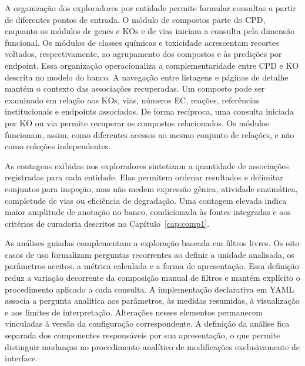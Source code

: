 A organização dos exploradores por entidade permite formular consultas a
partir de diferentes pontos de entrada. O módulo de compostos parte do CPD,
enquanto os módulos de genes e KOs e de vias iniciam a consulta pela dimensão
funcional. Os módulos de classes químicas e toxicidade acrescentam recortes
voltados, respectivamente, ao agrupamento dos compostos e às predições por
endpoint. Essa organização operacionaliza a complementaridade entre CPD e KO
descrita no modelo do banco. A navegação entre listagens e páginas de detalhe mantém o contexto das
associações recuperadas. Um composto pode ser examinado em relação aos KOs,
vias, números EC, reações, referências institucionais e endpoints associados.
De forma recíproca, uma consulta iniciada por KO ou via permite recuperar os
compostos relacionados. Os módulos funcionam, assim, como diferentes acessos
ao mesmo conjunto de relações, e não como coleções independentes.


As contagens exibidas nos exploradores sintetizam a quantidade de associações
registradas para cada entidade. Elas permitem ordenar resultados e delimitar
conjuntos para inspeção, mas não medem expressão gênica, atividade enzimática,
completude de vias ou eficiência de degradação. Uma contagem elevada indica
maior amplitude de anotação no banco, condicionada às fontes integradas e aos
critérios de curadoria descritos no Capítulo~\ref{cap:comp1}.

As análises guiadas complementam a exploração baseada em filtros livres. Os
oito casos de uso formalizam perguntas recorrentes ao definir a unidade
analisada, os parâmetros aceitos, a métrica calculada e a forma de
apresentação. Essa definição reduz a variação decorrente da composição manual
de filtros e mantém explícito o procedimento aplicado a cada consulta. A implementação declarativa em YAML associa a pergunta analítica aos
parâmetros, às medidas resumidas, à visualização e aos limites de
interpretação. Alterações nesses elementos permanecem vinculadas à versão da
configuração correspondente. A definição da análise fica separada dos
componentes responsáveis por sua apresentação, o que permite distinguir
mudanças no procedimento analítico de modificações exclusivamente de interface.

